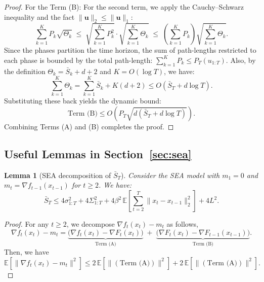 \documentclass[journal,onecolumn]{IEEEtran}
\theoremstyle{plain}
\newtheorem{lemma}[theorem]{Lemma}
\theoremstyle{definition}
\theoremstyle{remark}
\begin{document}
{\begin{proof}
    For the Term (B): For the second term, we apply the Cauchy--Schwarz
    inequality and the fact $\|\mathbf{u}\|_{2} \le \|\mathbf{u}\|_{1}$:
    \begin{equation*}
        \sum_{k=1}^{K} P_{k}\sqrt{\Theta_{k}}\;\le\; \sqrt{\sum_{k=1}^{K} P_{k}^{2}}
        \cdot \sqrt{\sum_{k=1}^{K} \Theta_{k}}\;\le\; \left(\sum_{k=1}^{K} P_{k}\right
        ) \sqrt{\sum_{k=1}^{K} \Theta_{k}}.
    \end{equation*}
    Since the phases partition the time horizon, the sum of path-lengths
    restricted to each phase is bounded by the total path-length: $\sum_{k=1}^{K}
    P_{k} \le P_{T}(u_{1:T})$. Also, by the definition $\Theta_{k} = \bar S_{k} +
    d + 2$ and $K=O(\log T)$, we have:
    \begin{equation*}
        \sum_{k=1}^{K} \Theta_{k} = \sum_{k=1}^{K} \bar S_{k} + K(d+2) \le O(\bar
        S_{T} + d\log T).
    \end{equation*}
    Substituting these back yields the dynamic bound:
    \begin{equation*}
        \text{Term (B)}\le O\left( P_{T} \sqrt{d(\bar S_{T} + d\log T)}\right).
    \end{equation*}
    Combining Terms (A) and (B) completes the proof.
\end{proof}
\fi



\iffalse
\subsection{Useful Lemmas in Section~\ref{sec:sea}}

\begin{lemma}[SEA decomposition of $\bar S_{T}$]
    \label{lem:sea-decompose-ST} Consider the SEA model with $m_{1}=0$ and $m_{t}
    =\nabla f_{t-1}(x_{t-1})$ for $t\ge 2$. We have:
    \begin{equation*}
        \bar S_{T}\le 4\sigma_{1:T}^{2}+ 4\Sigma_{1:T}^{2}+ 4\beta^{2}\,\mathbb{E}
        \left[\sum_{t=2}^{T}\|x_{t}-x_{t-1}\|_{2}^{2}\right] + 4L^{2}.
    \end{equation*}
\end{lemma}

\begin{proof}
    For any $t\ge 2$, we decompose $\nabla f_{t}(x_{t})-m_{t}$ as follows,
    \begin{equation*}
        \nabla f_{t}(x_{t})-m_{t}= \underbrace{\bigl(\nabla f_t(x_t)-\nabla F_t(x_t)\bigr)}
        _{\text{Term (A)}}\;+\; \underbrace{\bigl(\nabla F_t(x_t)-\nabla F_{t-1}(x_{t-1})\bigr)}
        _{\text{Term (B)}}.
    \end{equation*}
    Then, we have
    \begin{equation*}
        \mathbb{E}\left[\|\nabla f_{t}(x_{t})-m_{t}\|^{2}\right] \le 2\,\mathbb{E}
        \left[\|(\text{Term (A)})\|^{2}\right] + 2\,\mathbb{E}\left[\|(\text{Term
        (A)})\|^{2}\right].
    \end{equation*}


\end{proof}}
\end{document}
